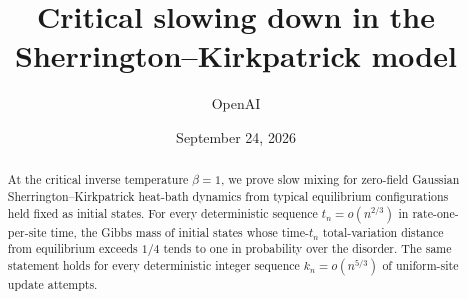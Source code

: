 \documentclass[11pt]{article}
\title{Critical slowing down in the\\Sherrington--Kirkpatrick model}
\author{OpenAI}
\date{September 24, 2026}
\theoremstyle{definition}
\theoremstyle{remark}
\numberwithin{equation}{section}
\begin{document}
\maketitle
\begin{abstract}
At the critical inverse temperature $\beta=1$, we prove slow mixing for zero-field Gaussian Sherrington--Kirkpatrick heat-bath dynamics from typical equilibrium configurations held fixed as initial states. For every deterministic sequence $t_n=o(n^{2/3})$ in rate-one-per-site time, the Gibbs mass of initial states whose time-$t_n$ total-variation distance from equilibrium exceeds $1/4$ tends to one in probability over the disorder. The same statement holds for every deterministic integer sequence $k_n=o(n^{5/3})$ of uniform-site update attempts.
\end{abstract}






\appendix



\end{document}
